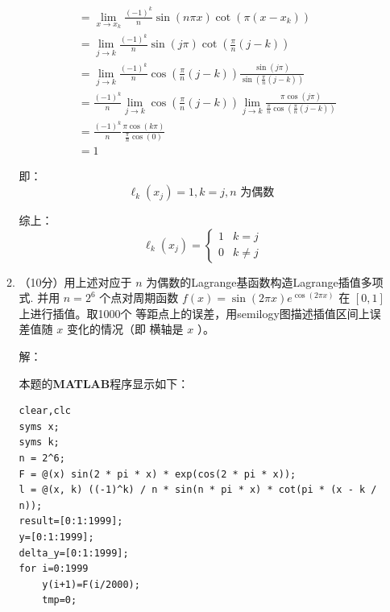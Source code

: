 \documentclass[12pt,a4paper,UTF8]{ctexart}
\theoremstyle{nonumberplain}
\begin{document}
\begin{enumerate}
\begin{enumerate}
$$\begin{aligned}
                                                       & =\lim_{x \to x_{k}}\frac{(-1)^{k}}{n} \sin (n \pi x) \cot \left(\pi\left(x-x_{k}\right)\right)                                                                                  \\
                                                       & =\lim_{j \to k}  \frac{(-1)^{k}}{n} \sin (j \pi ) \cot \left(\frac{\pi}{n}\left(j-k\right)\right)                                                                               \\
                                                       & =\lim_{j \to k}\frac{(-1)^{k}}{n}\cos\left(\frac{\pi}{n}\left(j-k\right)\right) \frac{\sin (j \pi )}{ \sin \left(\frac{\pi}{n}\left(j-k\right)\right)}                          \\
                                                       & =\frac{(-1)^{k}}{n}\lim_{j \to k}\cos\left(\frac{\pi}{n}\left(j-k\right)\right)\lim_{j \to k}\frac{\pi \cos(j\pi)}{\frac{\pi}{n}\cos\left(\frac{\pi}{n}\left(j-k\right)\right)} \\
                                                       & =\frac{(-1)^{k}}{n}\frac{\pi \cos(k\pi)}{\frac{\pi}{n}\cos\left(0\right)}                                                                                                       \\
                                                       & =1
                        \end{aligned}
                    $$
                    \par 即：
                    $$\ell_{k}\left(x_{j}\right)=1,k = j,n \text { 为偶数 }$$
                    \par 综上：
                    $$
                        \ell_{k}\left(x_{j}\right)=\left\{\begin{array}{ll}
                            1 & k=j      \\
                            0 & k \neq j
                        \end{array}\right.
                    $$
              \item （10分）用上述对应于 $n$ 为偶数的Lagrange基函数构造Lagrange插值多项式. 并用 $n=2^{6}$ 个点对周期函数 $f(x)=\sin (2 \pi x) e^{\cos (2 \pi x)}$ 在 $[0,1]$ 上进行插值。取1000个 等距点上的误差，用semilogy图描述插值区间上误差值随 $x$ 变化的情况（即
                    横轴是 $x$ ）。
                    \par 解：
                    \par 本题的\textbf{MATLAB}程序显示如下：
                    \begin{lstlisting}[frame=single]
clear,clc
syms x;
syms k;
n = 2^6;
F = @(x) sin(2 * pi * x) * exp(cos(2 * pi * x));
l = @(x, k) ((-1)^k) / n * sin(n * pi * x) * cot(pi * (x - k / n));
result=[0:1:1999];
y=[0:1:1999];
delta_y=[0:1:1999];
for i=0:1999
    y(i+1)=F(i/2000);
    tmp=0;


\end{lstlisting}
\end{enumerate}
\end{enumerate}
\end{document}
